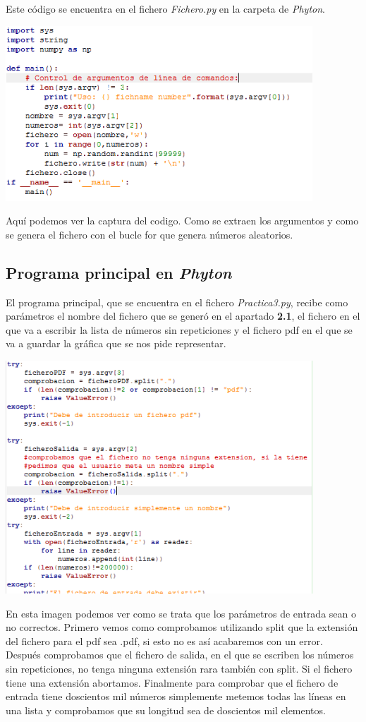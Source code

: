 \documentclass{article}
\begin{document}
Este código se encuentra en el fichero \textit{Fichero.py} en la carpeta de \textit{Phyton}.

\includegraphics[width=11.5cm]{fichero.PNG}

Aquí podemos ver la captura del codigo. Como se extraen los argumentos y como se genera el fichero con el bucle for que genera números aleatorios.

\subsection{Programa principal en \textit{Phyton}}
El programa principal, que se encuentra en el fichero \textit{Practica3.py}, recibe como parámetros el nombre del fichero que se generó en el apartado \textbf{2.1}, el fichero en el que va a escribir la lista de números sin repeticiones y el fichero pdf en el que se va a guardar la gráfica que se nos pide representar.

\includegraphics[width=11.5cm]{Tratamiento_Errores.PNG}

En esta imagen podemos ver como se trata que los parámetros de entrada sean o no correctos. Primero vemos como comprobamos utilizando split que la extensión del fichero para el pdf sea .pdf, si esto no es así acabaremos con un error. Después comprobamos que el fichero de salida, en el que se escriben los números sin repeticiones, no tenga ninguna extensión rara también con split. Si el fichero tiene una extensión abortamos. Finalmente para comprobar que el fichero de entrada tiene doscientos mil números simplemente metemos todas las líneas en una lista y comprobamos que su longitud sea de doscientos mil elementos.
\end{document}
